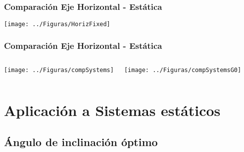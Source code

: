 \documentclass[serif, xcolor=dvipsnames]{beamer}
\begin{document}
\begin{frame}[plain]
  \frametitle{Comparación Eje Horizontal - Estática}

    \texttt{[image: ../Figuras/HorizFixed]}

\end{frame}

\begin{frame}[plain]
  \frametitle{Comparación Eje Horizontal - Estática}
  \begin{columns}%


    \column{6cm}

    \texttt{[image: ../Figuras/compSystems]}

    \column{6cm}

    \texttt{[image: ../Figuras/compSystemsG0]}

  \end{columns}%
\end{frame}


\section{Aplicación a Sistemas estáticos}


\subsection{Ángulo de inclinación óptimo}
\end{document}
